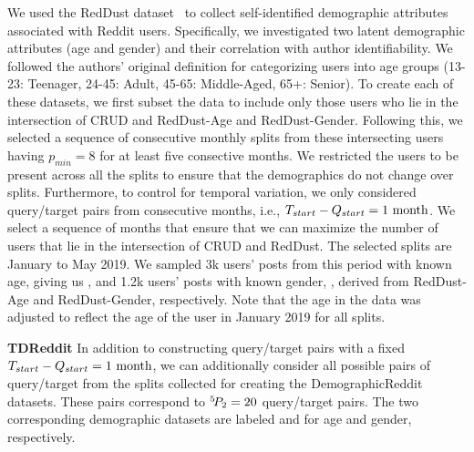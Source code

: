 We used the RedDust dataset~\cite{tigunova2020reddust} to collect self-identified demographic attributes associated with Reddit users. 
Specifically, we investigated two latent demographic attributes (age and gender) and their correlation with author identifiability.
We followed the authors' original definition for categorizing users into age groups (13-23: Teenager, 24-45: Adult, 45-65: Middle-Aged, 65+: Senior).
To create each of these datasets, we first subset the data to include only those users who lie in the intersection of CRUD and RedDust-Age and RedDust-Gender. 
Following this, we selected a sequence of consecutive monthly splits from these intersecting users having $p_{min} = 8$ for at least five consective months. 
We restricted the users to be present across all the splits to ensure that the demographics do not change over splits.
Furthermore, to control for temporal variation, we only considered query/target pairs from consecutive months, i.e., $T_{start} - Q_{start} = 1~\rm{month}$.
We select a sequence of months that ensure that we can maximize the number of users that lie in the intersection of CRUD and RedDust.
The selected splits are January to May 2019.
We sampled 3k users' posts from this period with known age, giving us \DSagefixed{}, and 1.2k users' posts with known gender, \DSgenderfixed{}, derived from RedDust-Age and RedDust-Gender, respectively.
Note that the age in the data was adjusted to reflect the age of the user in January 2019 for all splits.

\textbf{TDReddit}
In addition to constructing query/target pairs with a fixed $T_{start} - Q_{start} = 1~\rm{month}$, we can additionally consider all possible pairs of query/target from the splits collected for creating the DemographicReddit datasets.
These pairs correspond to ${}^{5}\!P_{2} = 20$ query/target pairs.
The two corresponding demographic datasets are labeled \DSagevary{} and \DSgendervary{} for age and gender, respectively.

